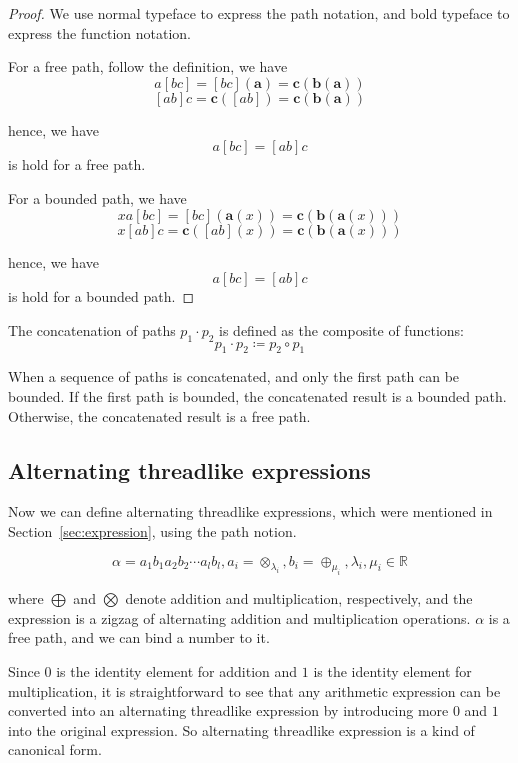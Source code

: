 \begin{proof}
We use normal typeface to express the path notation, and bold typeface to express the function notation.

For a free path, follow the definition, we have
\[a [b c] = [b c](\mathbf{a}) = \mathbf{c}(\mathbf{b}(\mathbf{a}))\]
\[[a b] c = \mathbf{c}([a b]) = \mathbf{c}(\mathbf{b}(\mathbf{a}))\]

hence, we have
\[a [b c] = [a b] c\]
is hold for a free path.

For a bounded path, we have
\[x a [b c] = [b c](\mathbf{a}(x)) = \mathbf{c}(\mathbf{b}(\mathbf{a}(x)))\]
\[x [a b] c = \mathbf{c}([a b](x)) = \mathbf{c}(\mathbf{b}(\mathbf{a}(x)))\]

hence, we have
\[a [b c] = [a b] c\]
is hold for a bounded path.

\end{proof}

\begin{definition}\label{definition:concatenate}
    The concatenation of paths $p_1 \cdot p_2$ is defined as the composite of functions:
    \[p_1 \cdot p_2 \coloneqq p_2 \circ p_1 \]
\end{definition}

When a sequence of paths is concatenated, and only the first path can be bounded.
If the first path is bounded, the concatenated result is a bounded path.
Otherwise, the concatenated result is a free path.

\subsection{Alternating threadlike expressions}\label{subsec:alternating}

Now we can define alternating threadlike expressions, which were mentioned in Section~\ref{sec:expression}, using the path notion.

\begin{equation}\label{eq:alternative}
    \alpha = a_1 b_1 a_2 b_2 \cdots a_l b_l, a_i = \otimes_{\lambda_i}, b_i = \oplus_{\mu_i}, \lambda_i, \mu_i \in \mathbb{R}
\end{equation}

where $\bigoplus$ and $\bigotimes$ denote addition and multiplication, respectively,
and the expression is a zigzag of alternating addition and multiplication operations.
$\alpha$ is a free path, and we can bind a number to it.

Since $0$ is the identity element for addition and $1$ is the identity element for multiplication,
it is straightforward to see that any arithmetic expression can be converted into an alternating threadlike expression
by introducing more $0$ and $1$ into the original expression.
So alternating threadlike expression is a kind of canonical form.


